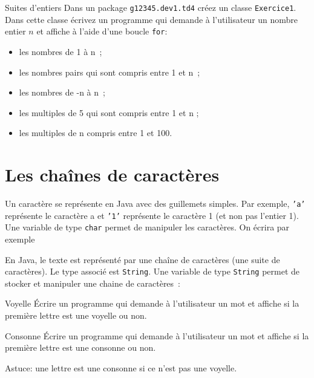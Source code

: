 \documentclass[a4paper,11pt]{article}
\begin{document}
 
	\begin{Exercice}{Suites d'entiers}	
		Dans un package \texttt{g12345.dev1.td4} créez un classe \texttt{Exercice1}.
		Dans cette classe écrivez un programme qui demande à l'utilisateur un nombre entier $n$ et affiche
		à l'aide d'une boucle \texttt{for}:
		\begin{itemize}
			\item  les nombres de 1 à n~;
			\item  les nombres pairs qui sont compris entre 1 et n~;
			\item les nombres de -n à n~;
			\item les multiples de 5 qui sont compris entre 1 et n ;
			\item les multiples de n compris entre 1 et 100.
		\end{itemize}
	\end{Exercice} 
 
\section{Les chaînes de caractères}
 
 	Un caractère se représente en Java avec des guillemets simples.
	Par exemple, \texttt{'a'} représente le caractère a et \texttt{'1'} représente le caractère 1 (et non pas l'entier 1).
	Une variable de type \texttt{char} permet de manipuler les caractères.
	On écrira par exemple  
	
	En Java, le texte est représenté par une chaîne de caractères (une suite de caractères). 
	Le type associé est \texttt{String}.
	Une variable de type \texttt{String} permet de stocker et manipuler une chaine de caractères~:

	\bigskip


	\begin{Exercice}{Voyelle}	
		\'Ecrire un programme qui demande à l'utilisateur 
		un mot et affiche si la première lettre est une voyelle ou non.
	\end{Exercice}

	\begin{Exercice}{Consonne}	
		\'Ecrire un programme qui demande à l'utilisateur 
		un mot et affiche si la première lettre est une consonne ou non.
		
		Astuce: une lettre est une consonne si ce n'est pas une voyelle.
	\end{Exercice}
\end{document}
